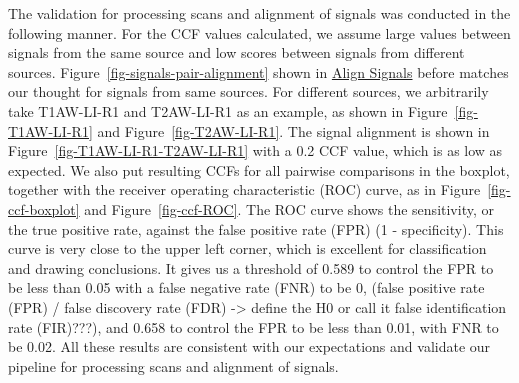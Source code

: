 \documentclass[fleqn,10pt]{wlscirep}
\newcommand{\tom}[1]{{\textcolor{RedOrange}{#1}}}
\begin{document}
The validation for processing scans and alignment of signals was
conducted in the following manner. For the CCF values calculated, we
assume large values between signals from the same source and low scores
between signals from different sources.
Figure~\ref{fig-signals-pair-alignment} shown in
\hyperref[sec-align-signals]{Align Signals} before matches our thought
for signals from same sources. For different sources, we arbitrarily
take T1AW-LI-R1 and T2AW-LI-R1 as an example, as shown in
Figure~\ref{fig-T1AW-LI-R1} and Figure~\ref{fig-T2AW-LI-R1}. The signal
alignment is shown in Figure~\ref{fig-T1AW-LI-R1-T2AW-LI-R1} with a 0.2
CCF value, which is as low as expected. We also put resulting CCFs for
all pairwise comparisons in the boxplot, together with the receiver
operating characteristic (ROC) curve, as in Figure~\ref{fig-ccf-boxplot}
and Figure~\ref{fig-ccf-ROC}. The ROC curve shows the sensitivity, or
the true positive rate, against the false positive rate (FPR) (1 -
specificity). This curve is very close to the upper left corner, which
is excellent for classification and drawing conclusions. It gives us a
threshold of 0.589 to control the FPR to be less than 0.05 with a false
negative rate (FNR) to be 0,
\tom{(false positive rate (FPR) / false discovery rate (FDR) -> define the H0 or call it false identification rate (FIR)???)},
and 0.658 to control the FPR to be less than 0.01, with FNR to be 0.02.
All these results are consistent with our expectations and validate our
pipeline for processing scans and alignment of signals.
\end{document}
